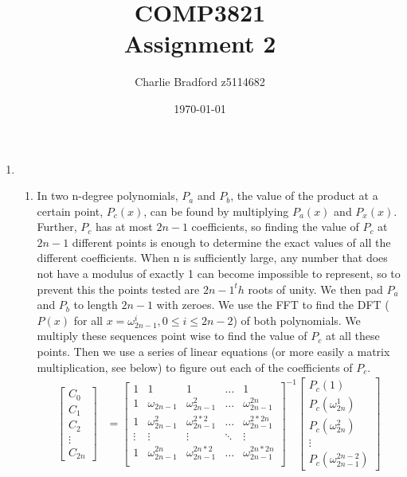 \documentclass[a4paper]{article}
\title{%
		COMP3821 \\
\large Assignment 2}
\author{Charlie Bradford z5114682}
\date{\today}
\begin{document}
\vspace{-2cm}
\maketitle

\begin{enumerate}
		\item \begin{enumerate}
						\item In two n-degree polynomials, $P_a$ and $P_b$, the value of the product at a certain point, $P_c (x)$, can be found by multiplying $P_a (x)$ and $P_x (x)$. Further, $P_c$ has at most $2n-1$ coefficients, so finding the value of $P_c$ at $2n-1$ different points is enough to determine the exact values of all the different coefficients. When n is sufficiently large, any number that does not have a modulus of exactly 1 can become impossible to represent, so to prevent this the points tested are $2n-1^th$ roots of unity. We then pad $P_a$ and $P_b$ to length $2n-1$ with zeroes. We use the FFT to find the DFT ($P(x)$ for all $x=\omega_{2n-1}^{i}, 0 \leq i \leq 2n-2$) of both polynomials. We multiply these sequences point wise to find the value of $P_c$ at all these points. Then we use a series of linear equations (or more easily a matrix multiplication, see below) to figure out each of the coefficients of $P_c$.
        \begin{align*}
            \left[ \begin{array}{c} C_0 \\ C_1 \\ C_2 \\ \vdots \\ C_{2n} \end{array} \right] &=
            \left[ \begin{array}{ccccc} 1 & 1 & 1 & \dots & 1 \\ 1 & \omega_{2n-1} & \omega_{2n-1}^2 & \dots & \omega_{2n-1}^{2n} 
            \\ 1 & \omega_{2n-1}^2 & \omega_{2n-1}^{2*2} & \dots & \omega_{2n-1}^{2*2n} 
            \\ \vdots & \vdots & \vdots & \ddots & \vdots \\
            1 & \omega_{2n-1}^{2n} & \omega_{2n-1}^{2n * 2} & \dots & \omega_{2n-1}^{2n * 2n} \\
                \end{array}\right]^{-1} \left[ \begin{array}{c} P_c (1) \\ P_c (\omega_{2n}^1) \\ P_c (\omega_{2n}^{2})\\ \vdots \\ P_c (\omega_{2n-1}^{2n-2}) \end{array} \right] \\

\end{align*}
\end{enumerate}
\end{enumerate}
\end{document}

